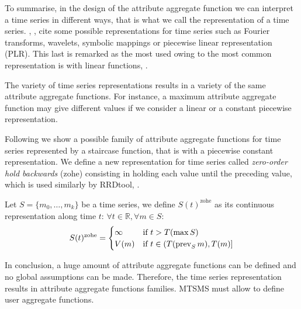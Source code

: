 
To summarise, in the design of the attribute aggregate function we can
interpret a time series in different ways, that is what we call the
representation of a time series. \citeauthor{last:keogh},
\cite{last:keogh}, cite some possible representations for time series
such as Fourier transforms, wavelets, symbolic mappings or piecewise
linear representation (PLR). This last is remarked as the most used
owing to the most common representation is with linear functions,
\cite{keogh01}.

The variety of time series representations results in a variety of the
same attribute aggregate functions. For instance, a maximum attribute
aggregate function may give different values if we consider a linear
or a constant piecewise representation.

Following we show a possible family of attribute aggregate functions
for time series represented by a staircase function, that is with a
piecewise constant representation.  We define a new representation for
time series called \emph{zero-order hold backwards} (zohe) consisting
in holding each value until the preceding value, which is used
similarly by RRDtool, \cite{lisa98:oetiker}.

Let $S=\{m_0,\ldots,m_k\}$ be a time series, we define
$S(t)^{\text{zohe}}$ as its continuous representation along time $t$:
$\forall t \in \mathbb{R}  ,\forall m \in S:$ 
\begin{equation}
 S(t)^{\text{zohe}} =  
\begin{cases}
  \infty & \text{if } t > T(\max S) \\%
  V(m) & \text{if }  t\in (T(\prev_S m),T(m)]
\end{cases}
\label{eq:zohe}
\end{equation}

In conclusion, a huge amount of attribute aggregate functions can be
defined and no global assumptions can be made.  Therefore, the time
series representation results in attribute aggregate functions
families.  MTSMS must allow to define user aggregate functions.








